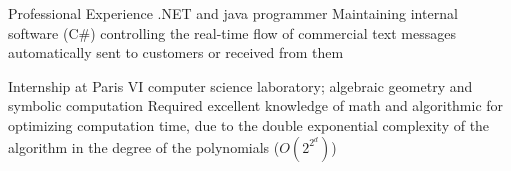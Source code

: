 \begin{rubric}{\color{ForestGreen} Professional Experience}
  .NET and java programmer
  Maintaining internal software (C\#) controlling the real-time flow of
  commercial text messages automatically sent to customers or received
  from them


  Internship at Paris VI computer science laboratory;
  algebraic geometry and symbolic computation
  Required excellent knowledge of math and algorithmic for optimizing
  computation time, due to the double exponential complexity of the
  algorithm in the degree of the polynomials ($O(2^{2^d})$)

\end{rubric}
